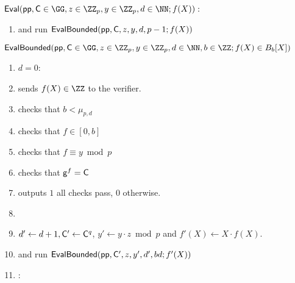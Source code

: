 \documentclass{article}
\theoremstyle{definition}
\begin{document}


\begin{mdframed}
\begin{minipage}{\textwidth}
			$\pro{Eval}(\crs, \gr{C}\in \GG, z\in \ZZ_p, y\in \ZZ_p, d \in \NN; f(X)) :$ 
			\begin{enumerate}[nolistsep]
			\item \prover and \verifier run $\textsf{{EvalBounded}}(\textsf{pp},\mathsf{C},z,y,d,p-1;f(X))$
		    \end{enumerate}
		$\pro{EvalBounded}(\crs,\gr{C}\in \GG,z\in \ZZ_p,y\in \ZZ_p,d\in \NN,b\in \ZZ;f(X)\in B_{b}[X])$
	    \begin{enumerate}[nolistsep]
        \item \pcif $d=0$:
        \item \pcind[1] \prover sends $f(X)\in \ZZ$ to the verifier. 
        \item \pcind[1] \verifier checks that $b< \mu_{p,d}$
        \item \pcind[1] \verifier checks that $f \in [0,b]$
          \item \pcind[1] \verifier checks that $f\equiv y \bmod p$
                \item \pcind[1] \verifier checks that $\mathsf{g}^{f}=\mathsf{C}$
\item \pcind[1] \verifier outputs $1$ \pcif all checks pass, $0$ otherwise.
          \item {}
         \item \pcind[1]  $d'\gets d+1, \mathsf{C}'\gets \mathsf{C}^q$, $y'\gets y\cdot z \bmod p$ and $f'(X)\gets X \cdot f(X)$.
         \item \pcind[1] \prover and \verifier run $\textsf{{EvalBounded}}(\textsf{pp},\mathsf{C}',z,y',d',bd;f'(X))$

        \item \pcelse: 
       

\end{enumerate}
\end{minipage}
\end{mdframed}
\end{document}
